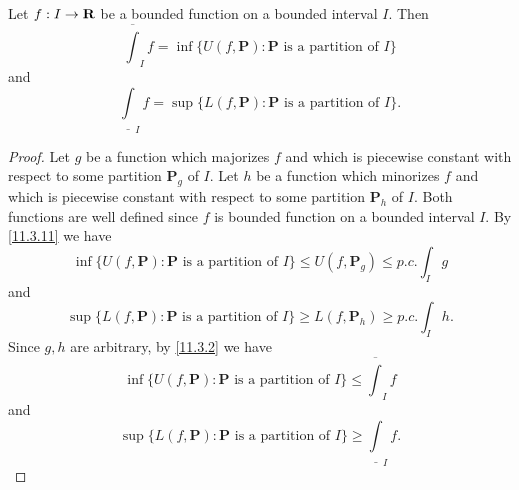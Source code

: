 \begin{proposition}\label{11.3.12}
  Let \(f : I \to \mathbf{R}\) be a bounded function on a bounded interval \(I\).
  Then
  \[
    \overline{\int}_I f = \inf\{U(f, \mathbf{P}) : \mathbf{P} \text{ is a partition of } I\}
  \]
  and
  \[
    \underline{\int}_I f = \sup\{L(f, \mathbf{P}) : \mathbf{P} \text{ is a partition of } I\}.
  \]
\end{proposition}

\begin{proof}
  Let \(g\) be a function which majorizes \(f\) and which is piecewise constant with respect to some partition \(\mathbf{P}_g\) of \(I\).
  Let \(h\) be a function which minorizes \(f\) and which is piecewise constant with respect to some partition \(\mathbf{P}_h\) of \(I\).
  Both functions are well defined since \(f\) is bounded function on a bounded interval \(I\).
  By \cref{11.3.11} we have
  \[
    \inf\big\{U(f, \mathbf{P}) : \mathbf{P} \text{ is a partition of } I\big\} \leq U(f, \mathbf{P}_g) \leq p.c. \int_I g
  \]
  and
  \[
    \sup\big\{L(f, \mathbf{P}) : \mathbf{P} \text{ is a partition of } I\big\} \geq L(f, \mathbf{P}_h) \geq p.c. \int_I h.
  \]
  Since \(g, h\) are arbitrary, by \cref{11.3.2} we have
  \[
    \inf\big\{U(f, \mathbf{P}) : \mathbf{P} \text{ is a partition of } I\big\} \leq \overline{\int}_I f
  \]
  and
  \[
    \sup\big\{L(f, \mathbf{P}) : \mathbf{P} \text{ is a partition of } I\big\} \geq \underline{\int}_I f.
  \]


\end{proof}

